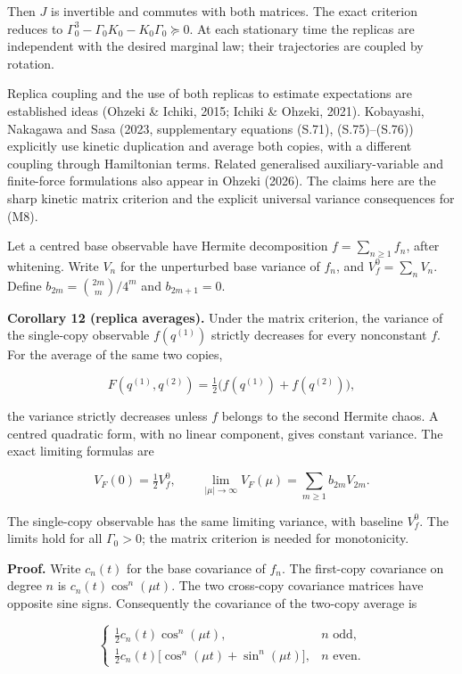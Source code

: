 \documentclass[
  british,
  11pt,
  a4paper,
]{article}
\begin{document}
Then \(J\) is invertible and commutes with both matrices. The exact
criterion reduces to \(\Gamma_0^3-\Gamma_0K_0-K_0\Gamma_0\succeq0\). At
each stationary time the replicas are independent with the desired
marginal law; their trajectories are coupled by rotation.

Replica coupling and the use of both replicas to estimate expectations
are established ideas (Ohzeki \& Ichiki, 2015; Ichiki \& Ohzeki, 2021).
Kobayashi, Nakagawa and Sasa (2023, supplementary equations (S.71),
(S.75)--(S.76)) explicitly use kinetic duplication and average both
copies, with a different coupling through Hamiltonian terms. Related
generalised auxiliary-variable and finite-force formulations also appear
in Ohzeki (2026). The claims here are the sharp kinetic matrix criterion
and the explicit universal variance consequences for (M8).

Let a centred base observable have Hermite decomposition
\(f=\sum_{n\ge1}f_n\), after whitening. Write \(V_n\) for the
unperturbed base variance of \(f_n\), and \(V_f^0=\sum_nV_n\). Define
\(b_{2m}=\binom{2m}{m}/4^m\) and \(b_{2m+1}=0\).

\textbf{Corollary 12 (replica averages).} Under the matrix criterion,
the variance of the single-copy observable \(f(q^{(1)})\) strictly
decreases for every nonconstant \(f\). For the average of the same two
copies,

\[
F(q^{(1)},q^{(2)})=\tfrac12\bigl(f(q^{(1)})+f(q^{(2)})\bigr),
\]

the variance strictly decreases unless \(f\) belongs to the second
Hermite chaos. A centred quadratic form, with no linear component, gives
constant variance. The exact limiting formulas are

\[
V_F(0)=\tfrac12V_f^0,\qquad
\lim_{|\mu|\to\infty}V_F(\mu)=\sum_{m\ge1}b_{2m}V_{2m}. \tag{M9}
\]

The single-copy observable has the same limiting variance, with baseline
\(V_f^0\). The limits hold for all \(\Gamma_0>0\); the matrix criterion
is needed for monotonicity.

\textbf{Proof.} Write \(c_n(t)\) for the base covariance of \(f_n\). The
first-copy covariance on degree \(n\) is \(c_n(t)\cos^n(\mu t)\). The
two cross-copy covariance matrices have opposite sine signs.
Consequently the covariance of the two-copy average is

\[
\begin{cases}
\tfrac12c_n(t)\cos^n(\mu t),&n\text{ odd},\\
\tfrac12c_n(t)\bigl[\cos^n(\mu t)+\sin^n(\mu t)\bigr],&n\text{ even}.
\end{cases} \tag{M10}
\]
\end{document}
